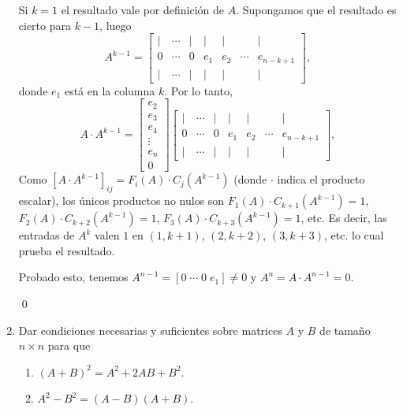 \begin{enumerate}[topsep=6pt,itemsep=.4cm]
Si $k=1$ el resultado vale por definición de $A$. Supongamos que el resultado es cierto para $k-1$,   luego \begin{equation*}
    A^{k-1}  = \begin{bmatrix} 
        \mid& \cdots & \mid& \mid& \mid&   &\mid\\ 
        0 & \cdots & 0 & e_{1}& e_2& \cdots &e_{n-k+1}\\ 
        \mid& \cdots& \mid& \mid& \mid&   &\mid
    \end{bmatrix},\tag{HI}
\end{equation*}
donde $e_1$  está en la columna $k$. Por lo tanto,
\begin{equation*}
    A \cdot A^{k-1}  = \begin{bmatrix}
        e_2 \\ e_3 \\ e_4 \\ \vdots \\ e_n \\0
    \end{bmatrix} \begin{bmatrix} 
        \mid& \cdots & \mid& \mid& \mid&   &\mid\\ 
        0 & \cdots & 0 & e_{1}& e_2& \cdots &e_{n-k+1}\\ 
        \mid& \cdots& \mid& \mid& \mid&   &\mid
    \end{bmatrix},
\end{equation*}
Como $[A\cdot A^{k-1}]_{ij} = F_i(A) \cdot C_j(A^{k-1})$ (donde $\cdot$ indica el producto escalar), los únicos productos no nulos son $ F_1(A) \cdot C_{k+1}(A^{k-1}) = 1$,  $ F_2(A) \cdot C_{k +2}(A^{k-1}) = 1$, $ F_3(A) \cdot C_{k +3}(A^{k-1}) = 1$, etc. Es decir, las entradas de $A^k$ valen $1$ en $(1,k+1)$, $(2,k+2)$, $(3,k+3)$, etc. lo cual prueba el resultado. 


Probado esto, tenemos $A^{n-1} = [0 \;\cdots\; 0\; e_1] \ne 0$ y $A^n = A \cdot A^{n-1}=0$. 

\qed


\item\label{eq:binomio}  Dar condiciones necesarias y suficientes sobre matrices $A$ y $B$ de tamaño $n\times n$ para que
\begin{multicols}{2}
    \begin{enumerate}
        \item\label{ej-p3-8-a} $(A + B)^2 = A^2 + 2AB + B^2$.
        \item\label{ej-p3-8-b} $A^2 - B^2 = (A - B)(A + B)$.
    \end{enumerate}
\end{multicols}
\rta


\end{enumerate}
